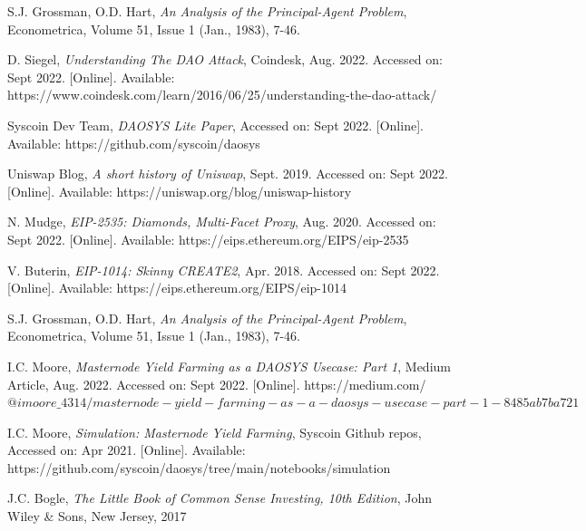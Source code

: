 \documentclass[journal,twocolumn,12pt]{ieeesyscoin}
\begin{document}
\begin{thebibliography}{00}

 S.J. Grossman, O.D. Hart, \textit{An Analysis of the Principal-Agent Problem}, Econometrica, Volume 51, Issue 1 (Jan., 1983), 7-46.

 D. Siegel, \textit{Understanding The DAO Attack}, Coindesk, Aug. 2022. Accessed on: Sept 2022. [Online]. Available: https://www.coindesk.com/learn/2016/06/25/understanding-the-dao-attack/

 Syscoin Dev Team, \textit{DAOSYS Lite Paper}, Accessed on: Sept 2022.  [Online]. Available:  https://github.com/syscoin/daosys

 Uniswap Blog, \textit{A short history of Uniswap}, Sept. 2019. Accessed on: Sept 2022.  [Online]. Available:  https://uniswap.org/blog/uniswap-history

 N. Mudge, \textit{EIP-2535: Diamonds, Multi-Facet Proxy}, Aug. 2020. Accessed on: Sept 2022.  [Online]. Available: https://eips.ethereum.org/EIPS/eip-2535

 V. Buterin, \textit{EIP-1014: Skinny CREATE2}, Apr. 2018. Accessed on: Sept 2022.  [Online]. Available: https://eips.ethereum.org/EIPS/eip-1014

 S.J. Grossman, O.D. Hart, \textit{An Analysis of the Principal-Agent Problem}, Econometrica, Volume 51, Issue 1 (Jan., 1983), 7-46.

 I.C. Moore,  \textit{Masternode Yield Farming as a DAOSYS Usecase: Part 1}, Medium Article, Aug. 2022. Accessed on: Sept 2022.  [Online]. https://medium.com/$@imoore\_4314/masternode-yield-farming-as-a-daosys-usecase-part-1-8485ab7ba721$

 I.C. Moore, \textit{Simulation: Masternode Yield Farming}, Syscoin Github repos, Accessed on: Apr 2021.  [Online]. Available: https://github.com/syscoin/daosys/tree/main/notebooks/simulation

 J.C. Bogle, \textit{The Little Book of Common Sense Investing, 10th Edition}, John Wiley \& Sons, New Jersey, 2017

\end{thebibliography}


\EOD
\end{document}
